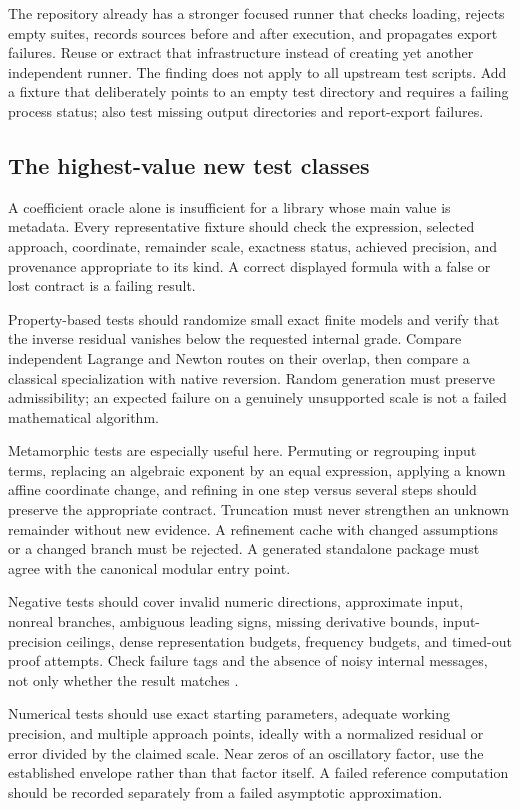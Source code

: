 \documentclass[11pt,a4paper]{article}
\newcommand{\code}[1]{\texttt{\detokenize{#1}}}
\begin{document}
The repository already has a stronger focused runner that checks loading,
rejects empty suites, records sources before and after execution, and
propagates export failures. Reuse or extract that infrastructure instead of
creating yet another independent runner. The finding does not apply to all
upstream test scripts. Add a fixture that deliberately points to an empty
test directory and requires a failing process status; also test missing
output directories and report-export failures.

\subsection{The highest-value new test classes}
A coefficient oracle alone is insufficient for a library whose main value
is metadata. Every representative fixture should check the expression,
selected approach, coordinate, remainder scale, exactness status, achieved
precision, and provenance appropriate to its kind. A correct displayed
formula with a false or lost contract is a failing result.

Property-based tests should randomize small exact finite models and verify
that the inverse residual vanishes below the requested internal grade.
Compare independent Lagrange and Newton routes on their overlap, then
compare a classical specialization with native reversion. Random generation
must preserve admissibility; an expected failure on a genuinely unsupported
scale is not a failed mathematical algorithm.

Metamorphic tests are especially useful here. Permuting or regrouping input
terms, replacing an algebraic exponent by an equal expression, applying a
known affine coordinate change, and refining in one step versus several
steps should preserve the appropriate contract. Truncation must never
strengthen an unknown remainder without new evidence. A refinement cache
with changed assumptions or a changed branch must be rejected. A generated
standalone package must agree with the canonical modular entry point.

Negative tests should cover invalid numeric directions, approximate input,
nonreal branches, ambiguous leading signs, missing derivative bounds,
input-precision ceilings, dense representation budgets, frequency budgets,
and timed-out proof attempts. Check failure tags and the absence of noisy
internal messages, not only whether the result matches \code{_Failure}.

Numerical tests should use exact starting parameters, adequate working
precision, and multiple approach points, ideally with a normalized residual
or error divided by the claimed scale. Near zeros of an oscillatory factor,
use the established envelope rather than that factor itself. A failed
\code{FindRoot} reference computation should be recorded separately from
a failed asymptotic approximation.
\end{document}
